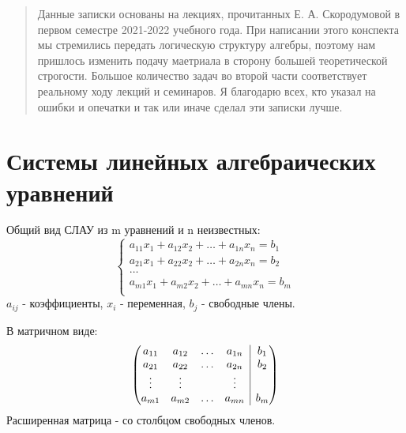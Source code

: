 \begin{abstract}
    Данные записки основаны на лекциях, прочитанных Е. А. Скородумовой в
	первом семестре 2021-2022 учебного года. При написании этого конспекта мы 
	стремились передать логическую структуру алгебры, поэтому нам пришлось
	изменить подачу маетриала в сторону большей теоретической строгости. 
	Большое количество задач во второй части соответствует реальному ходу 
	лекций и семинаров. Я благодарю всех, кто указал на ошибки и опечатки и 
	так или иначе сделал эти  записки лучше.  
\end{abstract}


\section{Системы линейных алгебраических уравнений}
Общий вид СЛАУ из m уравнений и n неизвестных:\\
\begin{equation*}
\begin{cases}
a_{11}x_1+a_{12}x_2+\dots+a_{1n}x_n=b_1\\
a_{21}x_1+a_{22}x_2+\dots+a_{2n}x_n=b_2\\
\ldots \\
a_{m1}x_1+a_{m2}x_2+\dots+a_{mn}x_n=b_m\\
\end{cases}
\end{equation*}
$a_{ij}$ - коэффициенты, $x_i$ - переменная, $b_j$ - свободные члены.

В матричном виде:\\
\begin{equation*}
    \begin{pmatrix} 
a_{11} & a_{12} & \ldots & a_{1n}&\multicolumn{1}{|c}{b_1}\\
a_{21} & a_{22} & \ldots & a_{2n}&\multicolumn{1}{|c}{b_2}\\
\vdots & \vdots & {} & \vdots &\multicolumn{1}{|c}{}\\
a_{m1} & a_{m2} & \ldots & a_{mn} &\multicolumn{1}{|c}{b_m}
    \end{pmatrix}
\end{equation*}
Расширенная матрица - со столбцом свободных членов.


